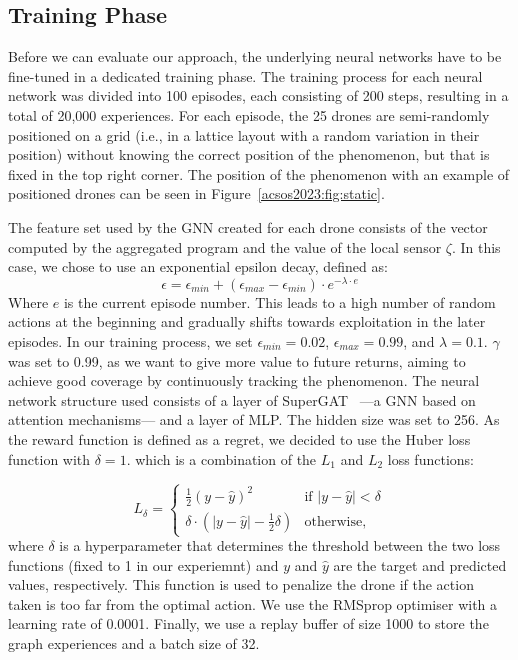 \subsection{Training Phase}
Before we can evaluate our approach, the underlying neural networks have to be fine-tuned in a dedicated training phase.
The training process for each neural network was divided into 100 episodes, each consisting of 200 steps, resulting in a total of 20,000 experiences.
%
For each episode, 
 the 25 drones are semi-randomly positioned on a grid (i.e., in a lattice layout with a random variation in their position) without knowing the correct position of the phenomenon, 
 but that is fixed in the top right corner. 
 The position of the phenomenon with an example of positioned drones can be seen in Figure~\ref{acsos2023:fig:static}. 

 The feature set used by the \ac{GNN} created for each drone consists of the vector computed by the aggregated program and the value of the local sensor $\zeta$.
%
In this case, we chose to use an exponential epsilon decay, defined as:
$$\epsilon = \epsilon_{min} + (\epsilon_{max} - \epsilon_{min}) \cdot e^{-\lambda \cdot e}$$
Where $e$ is the current episode number. 
This leads to a high number of random actions at the beginning and gradually shifts towards exploitation in the later episodes. 
%
In our training process, 
 we set $\epsilon_{min} = 0.02$, $\epsilon_{max} = 0.99$, and $\lambda = 0.1$.
$\gamma$ was set to 0.99, 
 as we want to give more value to future returns, 
 aiming to achieve good coverage by continuously tracking the phenomenon. 
The neural network structure used consists of a layer of SuperGAT~\cite{DBLP:journals/corr/abs-2204-04879} ---a \ac{GNN} based on attention mechanisms--- and a layer of MLP. 
The hidden size was set to 256.
%
As the reward function is defined as a regret, 
 we decided to use the Huber loss function with $\delta = 1$. %
 which is a combination of the $L_1$ and $L_2$ loss functions:

\begin{equation*}
L_\delta = \begin{cases}
  \frac{1}{2} (y - \hat{y})^2 & \text{if } |y - \hat{y}| < \delta \\
  \delta \cdot (|y - \hat{y}| - \frac{1}{2} \delta) & \text{otherwise,} 
 \end{cases}
\end{equation*}
where $\delta$ is a hyperparameter that determines the threshold between the two loss functions (fixed to 1 in our experiemnt) and $y$ and $\hat{y}$ are the target and predicted values, respectively.
This function is used to penalize the drone if the action taken is too far from the optimal action. 
%
We use the RMSprop optimiser with a learning rate of 0.0001.
%
Finally, we use a replay buffer of size 1000 to store the graph experiences and a batch size of 32.
